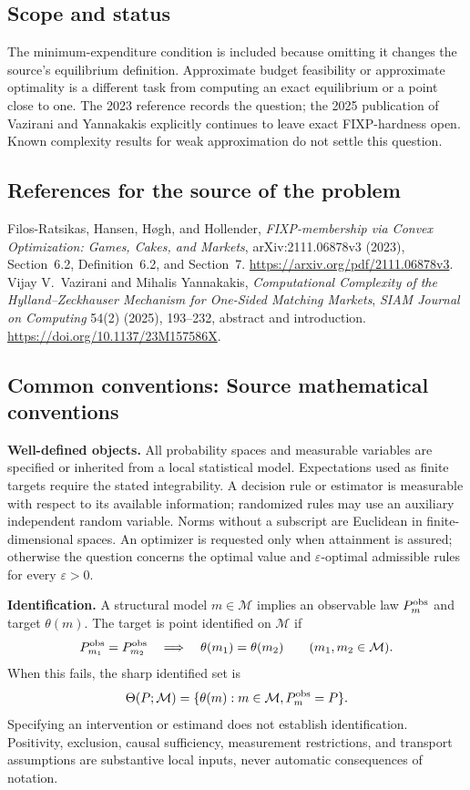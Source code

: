 \documentclass[11pt,a4paper]{article}
\begin{document}
\subsection*{Scope and status}
The minimum-expenditure condition is included because omitting it changes the source's equilibrium definition. Approximate budget feasibility or approximate optimality is a different task from computing an exact equilibrium or a point close to one. The 2023 reference records the question; the 2025 publication of Vazirani and Yannakakis explicitly continues to leave exact FIXP-hardness open. Known complexity results for weak approximation do not settle this question.
\subsection*{References for the source of the problem}
Filos-Ratsikas, Hansen, H\o gh, and Hollender, \emph{FIXP-membership via Convex Optimization: Games, Cakes, and Markets}, arXiv:2111.06878v3 (2023), Section~6.2, Definition~6.2, and Section~7. \url{https://arxiv.org/pdf/2111.06878v3}. Vijay V.~Vazirani and Mihalis Yannakakis, \emph{Computational Complexity of the Hylland--Zeckhauser Mechanism for One-Sided Matching Markets}, \emph{SIAM Journal on Computing} 54(2) (2025), 193--232, abstract and introduction. \url{https://doi.org/10.1137/23M157586X}.

\subsection*{Common conventions: Source mathematical conventions}

\textbf{Well-defined objects.}
All probability spaces and measurable variables are specified or inherited
from a local statistical model. Expectations used as finite targets require
the stated integrability. A decision rule or estimator is measurable with
respect to its available information; randomized rules may use an auxiliary
independent random variable. Norms without a subscript are Euclidean in
finite-dimensional spaces. An optimizer is requested only when attainment
is assured; otherwise the question concerns the optimal value and
$\varepsilon$-optimal admissible rules for every $\varepsilon>0$.

\textbf{Identification.}
A structural model $m\in\mathcal M$ implies an observable law
$P_m^{\rm obs}$ and target $\theta(m)$. The target is point identified on
$\mathcal M$ if
\[
 P_{m_1}^{\rm obs}=P_{m_2}^{\rm obs}
 \quad\Longrightarrow\quad\theta(m_1)=\theta(m_2)
 \qquad(m_1,m_2\in\mathcal M).
\]
When this fails, the sharp identified set is
\[
 \Theta(P;\mathcal M)=\{\theta(m):m\in\mathcal M,
                                  P_m^{\rm obs}=P\}.
\]
Specifying an intervention or estimand does not establish identification.
Positivity, exclusion, causal sufficiency, measurement restrictions, and
transport assumptions are substantive local inputs, never automatic
consequences of notation.
\end{document}
